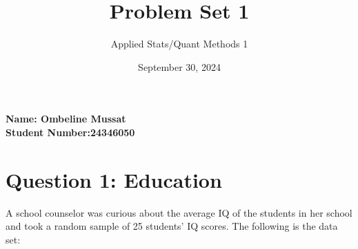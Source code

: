 \documentclass[12pt,letterpaper]{article}
\title{Problem Set 1}
\date{September 30, 2024}
\author{Applied Stats/Quant Methods 1}
\begin{document}
	\maketitle
	\vspace{-2em} 
	\noindent \textbf{Name: Ombeline Mussat} \\
	\noindent \textbf{Student Number:24346050} \\

	
	\vspace{1cm}
	\section*{Question 1: Education}
	
	A school counselor was curious about the average IQ of the students in her school and took a random sample of 25 students' IQ scores. The following is the data set:\\
	\vspace{.5cm}
	
	
	
	\vspace{1cm}
	
\end{document}
